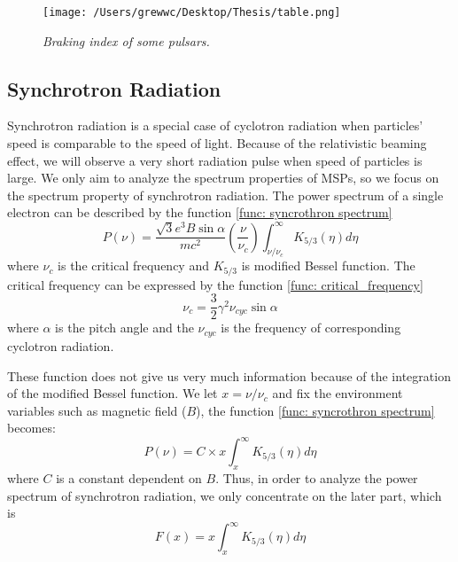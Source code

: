 \documentclass[12pt]{report}
\newcommand{\mycaption}[1]{\caption{\textit{\footnotesize #1}}}
\begin{document}
            
            \begin{figure}[!ht]
              \centering
              \texttt{[image: /Users/grewwc/Desktop/Thesis/table.png]}
              \mycaption{Braking index of some pulsars.}
              \label{fig:braking_index}
            \end{figure}
    
        \subsection{Synchrotron Radiation}
              Synchrotron radiation is a special case of cyclotron radiation when particles' speed is comparable to the 
              speed of light. Because of the relativistic beaming effect, we will observe a very short radiation pulse 
              when speed of particles is large. 
              We only aim to analyze the spectrum properties of MSPs, so we focus on the 
              spectrum property of synchrotron radiation. The power spectrum of a single electron  
              can be described by the function \ref{func: syncrothron spectrum}
            \begin{equation}
              \label{func: syncrothron spectrum}
              P\left(\nu\right) = \frac{\sqrt{3} e^3 B \sin{\alpha}}{m c^2} 
                \left(\frac{\nu}{\nu_c}\right) \int_{\nu / \nu_c}^{\infty} K_{5/3}\left(\eta \right)d\eta 
            \end{equation}
            where $\nu_c$ is the critical frequency and $K_{5/3}$ is modified Bessel function. The critical frequency 
            can be expressed by the function \ref{func: critical_frequency}
            \begin{equation}
              \label{func: critical_frequency}
              \nu_c = \frac{3}{2} \gamma^2 \nu_{cyc} \sin{\alpha}
            \end{equation} 
            where $\alpha$ is the pitch angle and the $\nu_{cyc}$ is the frequency of corresponding cyclotron radiation. 
  
            These function does not give us very much information because of the integration of the modified Bessel 
            function. We let $x = \nu / \nu_c$ and fix the environment variables such as magnetic field ($B$), 
            the function \ref{func: syncrothron spectrum} becomes: 
            \begin{equation}
              \label{func: to_x}
              P\left(\nu\right) = C \times x \int_{x}^{\infty} K_{5/3}\left(\eta \right)d\eta 
            \end{equation}
            where $C$ is a constant dependent on $B$. Thus, in order to analyze the power spectrum of synchrotron radiation,
            we only concentrate on the later part, which is
            \begin{equation}
              \label{func: fx}
              F\left(x\right) = x \int_{x}^{\infty} K_{5/3}\left(\eta \right)d\eta 
            \end{equation}
            
\end{document}
